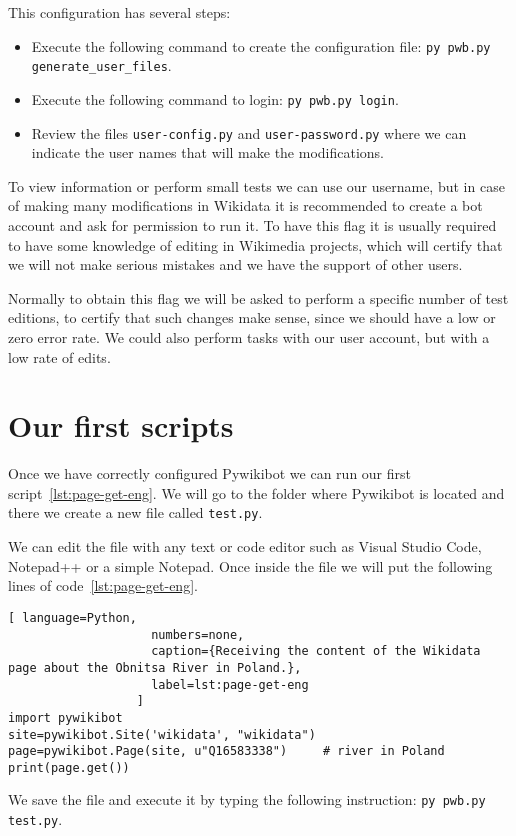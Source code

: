 This configuration has several steps:
\begin{itemize}
  \setlength{\itemindent}{2em}
  \item Execute the following command to create the configuration file: \lstinline|py pwb.py generate_user_files|.
  \item Execute the following command to login: \lstinline|py pwb.py login|.
  \item Review the files \lstinline|user-config.py| and \lstinline|user-password.py| where we can indicate the user names that will make the modifications.
\end{itemize}

To view information or perform small tests we can use our username, but in case of making many modifications in Wikidata it is recommended to create a bot account and ask for permission to run it. To have this flag it is usually required to have some knowledge of editing in Wikimedia projects, which will certify that we will not make serious mistakes and we have the support of other users.

Normally to obtain this flag we will be asked to perform a specific number of test editions, to certify that such changes make sense, since we should have a low or zero error rate. We could also perform tasks with our user account, but with a low rate of edits.


\section{Our first scripts}
\label{sec:firstScript}

Once we have correctly configured Pywikibot we can run our first script~\ref{lst:page-get-eng}. 
We will go to the folder where Pywikibot is located and there we create a new file called \lstinline|test.py|.

We can edit the file with any text or code editor such as Visual Studio Code, Notepad++ or a simple Notepad.
Once inside the file we will put the following lines of code~\ref{lst:page-get-eng}.

\renewcommand{\lstlistingname}{Listing} %
\begin{lstlisting}[ language=Python,
                    numbers=none,
                    caption={Receiving the content of the Wikidata page about the Obnitsa River in Poland.},
                    label=lst:page-get-eng
                  ]
import pywikibot
site=pywikibot.Site('wikidata', "wikidata")
page=pywikibot.Page(site, u"Q16583338")     # river in Poland
print(page.get())
\end{lstlisting}
%
We save the file and execute it by typing the following instruction: \lstinline|py pwb.py test.py|.

